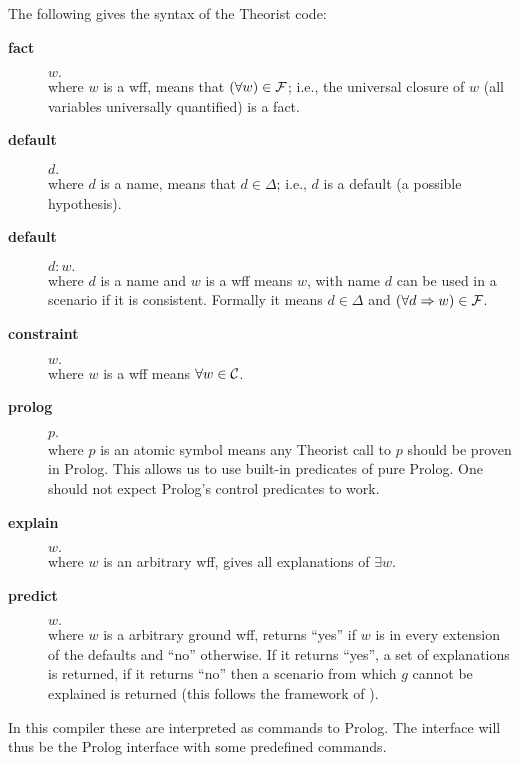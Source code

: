 The following gives the syntax of the Theorist code:
\begin{description}
\item[\bf fact]
$w.$\\
where $w$ is a wff,
means that $(\forall w) \in {\cal F}$; i.e., the universal closure of $w$ (all
variables universally quantified) is a fact.
\item[\bf default]
$d.$\\
where $d$ is a name,
means that $d\in \Delta$; i.e., $d$ is a default (a possible hypothesis).
\item[\bf default]
$d:w.$\\
where $d$ is a name and $w$ is a wff means $w$, with name $d$ can
be used in a scenario if it is consistent.
Formally it means $d\in  \Delta$ and
$(\forall d\Rightarrow w) \in {\cal F}$.
\item[\bf constraint]
$w.$\\
where $w$ is a wff means $\forall w\in \cal C$.
\item[\bf prolog]
$p.$\\
where $p$ is an atomic symbol means any Theorist call to $p$ should
be proven in Prolog. This allows us to use built-in predicates of pure Prolog.
One should not expect Prolog's control predicates to work.
\item[\bf explain]
$w.$\\
where $w$ is an arbitrary wff,
gives all explanations of $\exists w$.
\item[\bf predict]
$w.$\\
where $w$ is a arbitrary ground wff,
returns ``yes'' if $w$ is in every extension of the defaults
and ``no'' otherwise.
If it returns ``yes'', a set of explanations is returned, if
it returns ``no'' then a scenario from which $g$ cannot be explained is
returned (this follows the framework of \cite{poole:ep}).

\end{description}

In this compiler these are interpreted as commands to Prolog.
The interface will thus be the Prolog interface with some predefined
commands.

